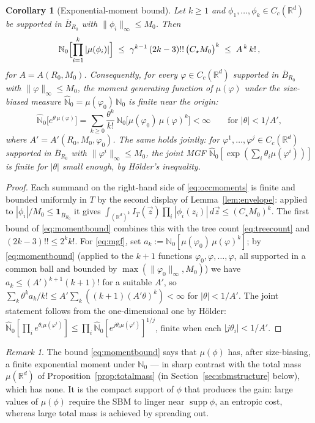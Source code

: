 \documentclass[11pt]{article}
\newtheorem{corollary}[theorem]{Corollary}
\theoremstyle{definition}
\theoremstyle{remark}
\newtheorem{remark}[theorem]{Remark}
\newcommand{\R}{\mathbb{R}}
\newcommand{\bN}{{\mathbb{N}_0}}                 %
\newcommand{\Ccg}{C_c(\R^d)}                   %
\newcommand{\supp}{\operatorname{supp}}
\newcommand{\Nh}{\hat{\mathbb{N}}_0}
\numberwithin{equation}{section}
\theoremstyle{plain}
\theoremstyle{definition}
\theoremstyle{remark}
\theoremstyle{plain}
\begin{document}
\begin{corollary}[Exponential-moment bound]\label{cor:carleman}
Let $k\ge1$ and $\phi_1,\dots,\phi_k\in\Ccg$ be supported in $\overline B_{R_0}$ with
$\|\phi_i\|_\infty\le M_0$. Then
\begin{equation}\label{eq:momentbound}
\bN\Bigl[\prod_{i=1}^k|\mu(\phi_i)|\Bigr]
\;\le\;\gamma^{k-1}\,(2k-3)!!\,\bigl(C_\star M_0\bigr)^{k}
\;\le\;A^{\,k}\,k!\,,
\end{equation}
for $A=A(R_0,M_0)$. Consequently, for every
$\varphi\in\Ccg$ supported in $\overline B_{R_0}$ with $\|\varphi\|_\infty\le M_0$, the
moment generating function of $\mu(\varphi)$ under the size-biased measure
$\Nh=\mu(\varphi_0)\,\bN$ is finite near the origin:
\begin{equation}\label{eq:mgf}
\Nh\bigl[e^{\theta\,\mu(\varphi)}\bigr]
=\sum_{k\ge0}\frac{\theta^k}{k!}\,\bN\bigl[\mu(\varphi_0)\,\mu(\varphi)^k\bigr]
<\infty\qquad\text{for } |\theta|<1/A',
\end{equation}
where $A'=A'(R_0,M_0,\varphi_0)$. The same holds jointly: for
$\varphi^1,\dots,\varphi^j\in\Ccg$ supported in $\overline B_{R_0}$ with
$\|\varphi^i\|_\infty\le M_0$, the joint MGF
$\Nh[\exp(\sum_i\theta_i\mu(\varphi^i))]$ is finite for $|\theta|$ small
enough, by H\"older's inequality.
\end{corollary}

\begin{proof}
Each summand on the right-hand side of \eqref{eq:occmoments} is finite and bounded uniformly in $T$ by the second display of Lemma~\ref{lem:envelope}: applied to $|\phi_i|/M_0\le\mathbf 1_{\overline B_{R_0}}$ it gives $\int_{(\R^d)^k}I_T(\vec z)\prod_i|\phi_i(z_i)|\,d\vec z\le(C_\star M_0)^k$. The first bound of \eqref{eq:momentbound} combines this with the tree count \eqref{eq:treecount} and $(2k-3)!!\le2^kk!$. For \eqref{eq:mgf}, set
$a_k:=\bN[\mu(\varphi_0)\,\mu(\varphi)^k]$; by \eqref{eq:momentbound} (applied
to the $k+1$ functions $\varphi_0,\varphi,\dots,\varphi$, all supported in a
common ball and bounded by $\max(\|\varphi_0\|_\infty,M_0)$) we have
$a_k\le (A')^{k+1}(k+1)!$ for a suitable $A'$, so
$\sum_k\theta^k a_k/k!\le A'\sum_k((k+1)(A'\theta)^k)<\infty$ for
$|\theta|<1/A'$. The joint statement follows from the one-dimensional one by
H\"older: $\Nh[\prod_i e^{\theta_i\mu(\varphi^i)}]
\le\prod_i\Nh[e^{j\theta_i\mu(\varphi^i)}]^{1/j}$, finite when each
$|j\theta_i|<1/A'$.
\end{proof}

\begin{remark}
The bound \eqref{eq:momentbound} says that $\mu(\phi)$ has, after
size-biasing, a finite exponential moment under $\bN$ --- in sharp contrast
with the total mass $\mu(\R^d)$ of Proposition~\ref{prop:totalmass} (in
Section~\ref{sec:sbmstructure} below), which has
none. It is the compact support of $\phi$ that produces the gain: large values
of $\mu(\phi)$ require the SBM to linger near $\supp\phi$, an entropic cost,
whereas large total mass is achieved by spreading out.
\end{remark}
\end{document}
